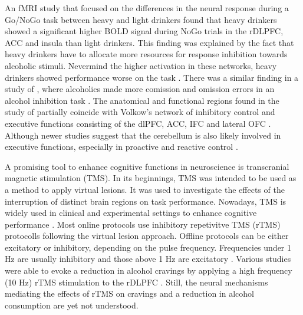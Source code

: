 \documentclass[12pt]{article}
\begin{document}
An fMRI study that focused on the differences in the neural response during a Go/NoGo task between heavy and light drinkers found that heavy drinkers showed a significant higher BOLD signal during NoGo trials in the rDLPFC, ACC and insula than light drinkers. This finding was explained by the fact that heavy drinkers have to allocate more resources for response inhibition towards alcoholic stimuli. Nevermind the higher activation in these networks, heavy drinkers showed performance worse on the task \parencite{amesNeuralCorrelatesGo2014}. There was a similar finding in a study of \textcite{noelAlcoholCuesIncrease2007}, where alcoholics made more comission and omission errors in an alcohol inhibition task \parencite{noelAlcoholCuesIncrease2007}. The anatomical and functional regions found in the study of \textcite{amesNeuralCorrelatesGo2014} partially coincide with Volkow's network of inhibitory control and executive functions consisting of the dlPFC, ACC, IFC and lateral OFC \parencite{volkowAddictionScienceUncovering2014}. Although newer studies suggest that the cerebellum is also likely involved in executive functions, especially in proactive and reactive control \parencite{clarkCerebellarContributionsProactive2020}. 

A promising tool to enhance cognitive functions in neuroscience is transcranial magnetic stimulation (TMS). In its beginnings, TMS was intended to be used as a method to apply virtual lesions. It was used to investigate the effects of the interruption of distinct brain regions on task performance. Nowadays, TMS is widely used in clinical and experimental settings to enhance cognitive performance \parencite{luberEnhancementHumanCognitive2014}. Most online protocols use inhibitory repetivitve TMS (rTMS) protocolls following the virtual lesion approach. Offline protocols can be either excitatory or inhibitory, depending on the pulse frequency. Frequencies under 1 Hz are usually inhibitory and those above 1 Hz are excitatory \parencite{beynelEffectsOnlineRepetitive2019}. Various studies were able to evoke a reduction in alcohol cravings by applying a high frequency (10 Hz) rTMS stimulation to the rDLPFC \parencite{antonelliTranscranialMagneticStimulation2021}. Still, the neural mechanisms mediating the effects of rTMS on cravings and a reduction in alcohol consumption are yet not understood. 
\end{document}
